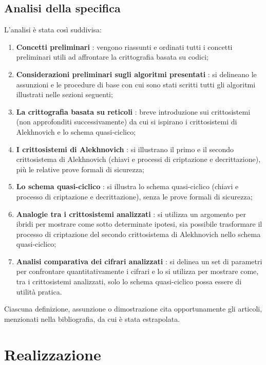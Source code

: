\documentclass[12pt, a4paper]{report}
\theoremstyle{definition}
\begin{document}
		\section{Analisi della specifica}
			L'analisi è stata così suddivisa:
			\begin{enumerate}
				\item \textbf{Concetti preliminari} : vengono riassunti e ordinati tutti i concetti preliminari utili ad affrontare la crittografia basata su codici;
				\item \textbf{Considerazioni preliminari sugli algoritmi presentati} : si delineano le assunzioni e le procedure di base con cui sono stati scritti tutti gli algoritmi illustrati nelle sezioni seguenti;
				\item \textbf{La crittografia basata su reticoli} : breve introduzione sui crittosistemi (non approfonditi successivamente) da cui si ispirano i crittosistemi di Alekhnovich e lo schema quasi-ciclico;
				\item \textbf{I crittosistemi di Alekhnovich} : si illustrano il primo e il secondo crittosistema di Alekhnovich (chiavi e processi di criptazione e decrittazione), più le relative prove formali di sicurezza;
				\item \textbf{Lo schema quasi-ciclico} : si illustra lo schema quasi-ciclico (chiavi e processo di criptazione e decrittazione), senza le prove formali di sicurezza;
				\item \textbf{Analogie tra i crittosistemi analizzati} : si utilizza un argomento per ibridi per mostrare come sotto determinate ipotesi, sia possibile trasformare il processo di criptazione del secondo crittosistema di Alekhnovich nello schema quasi-ciclico;
				\item \textbf{Analisi comparativa dei cifrari analizzati} : si delinea un set di parametri per confrontare quantitativamente i cifrari e lo si utilizza per mostrare come, tra i crittosistemi analizzati, solo lo schema quasi-ciclico possa essere di utilità pratica.
			\end{enumerate}
		Ciascuna definizione, assunzione o dimostrazione cita opportunamente gli articoli, menzionati nella bibliografia, da cui è stata estrapolata.
	\chapter{Realizzazione}
\end{document}
